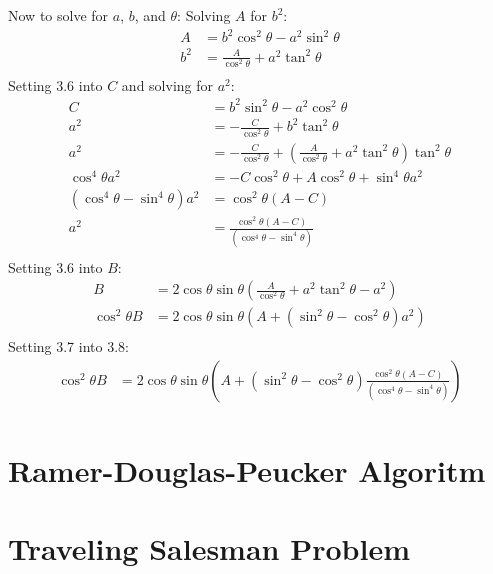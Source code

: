 Now to solve for $a$, $b$, and $\theta$:
Solving $A$ for $b^2$:
\begin{equation}
	\begin{split}
		A &= b^2 \cos^2\theta - a^2 \sin^2\theta \\
		b^2 &= \frac{A}{\cos^2\theta} + a^2\tan^2\theta \\
	\end{split}
\end{equation}
Setting 3.6 into $C$ and solving for $a^2$:
\begin{equation}
	\begin{split}
		C &= b^2 \sin^2\theta - a^2 \cos^2\theta \\
		a^2 &= -\frac{C}{\cos^2\theta} + b^2\tan^2\theta \\
		a^2 &= -\frac{C}{\cos^2\theta} + \left(\frac{A}{\cos^2\theta} + a^2\tan^2\theta\right)\tan^2\theta \\
		\cos^4\theta a^2 &= -C\cos^2\theta + A\cos^2\theta + \sin^4\theta a^2 \\
		(\cos^4\theta - \sin^4\theta) a^2  &= \cos^2\theta(A-C) \\
		a^2  &= \frac{\cos^2\theta(A-C)}{(\cos^4\theta - \sin^4\theta)} \\
	\end{split}
\end{equation}
Setting 3.6 into $B$:
\begin{equation}
	\begin{split}
		B &= 2 \cos\theta\sin\theta(\frac{A}{\cos^2\theta} + a^2\tan^2\theta - a^2) \\
		\cos^2\theta B &= 2 \cos\theta\sin\theta(A + (\sin^2\theta - \cos^2\theta) a^2) \\
	\end{split}
\end{equation}
Setting 3.7 into 3.8:
\begin{equation}
	\begin{split}
		\cos^2\theta B &= 2 \cos\theta\sin\theta(A + (\sin^2\theta - \cos^2\theta) \frac{\cos^2\theta(A-C)}{(\cos^4\theta - \sin^4\theta)}) \\
	\end{split}
\end{equation}

\section{Ramer-Douglas-Peucker Algoritm}

\section{Traveling Salesman Problem}


